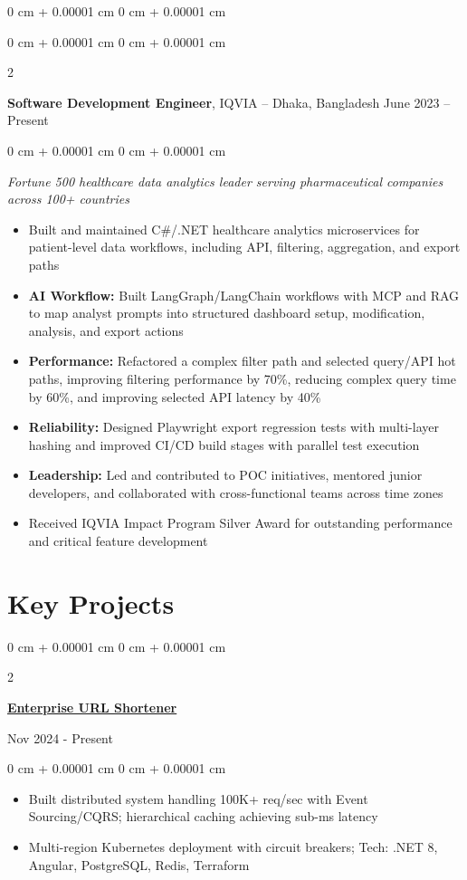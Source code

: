 \documentclass[10pt, letterpaper]{article}
\newenvironment{highlights}{
    \begin{itemize}[
        topsep=0.05 cm,
        parsep=0.05 cm,
        partopsep=0pt,
        itemsep=0pt,
        leftmargin=0 cm + 10pt
    ]
}{
    \end{itemize}
} %
\newenvironment{onecolentry}{
    \begin{adjustwidth}{
        0 cm + 0.00001 cm
    }{
        0 cm + 0.00001 cm
    }
}{
    \end{adjustwidth}
} %
\newenvironment{twocolentry}[2][]{
    \onecolentry
    \def\secondColumn{#2}
    \setcolumnwidth{\fill, 4.5 cm}
    \begin{paracol}{2}
}{
    \switchcolumn \raggedleft \secondColumn
    \end{paracol}
    \endonecolentry
} %
\begin{document}
\begin{onecolentry}
        \begin{twocolentry}{
            June 2023 – Present
        }
            \textbf{Software Development Engineer}, IQVIA -- Dhaka, Bangladesh\end{twocolentry}
        \begin{onecolentry}
            \textit{Fortune 500 healthcare data analytics leader serving pharmaceutical companies across 100+ countries}
            \begin{highlights}
                \item Built and maintained C\#/.NET healthcare analytics microservices for patient-level data workflows, including API, filtering, aggregation, and export paths
                \item \textbf{AI Workflow:} Built LangGraph/LangChain workflows with MCP and RAG to map analyst prompts into structured dashboard setup, modification, analysis, and export actions
                \item \textbf{Performance:} Refactored a complex filter path and selected query/API hot paths, improving filtering performance by 70\%, reducing complex query time by 60\%, and improving selected API latency by 40\%
                \item \textbf{Reliability:} Designed Playwright export regression tests with multi-layer hashing and improved CI/CD build stages with parallel test execution
                \item \textbf{Leadership:} Led and contributed to POC initiatives, mentored junior developers, and collaborated with cross-functional teams across time zones
                \item Received IQVIA Impact Program Silver Award for outstanding performance and critical feature development
            \end{highlights}
        \end{onecolentry}

    \section{Key Projects}

        \begin{twocolentry}{
            Nov 2024 - Present
        }
            \href{https://github.com/thromel/URLShortener}{\textbf{Enterprise URL Shortener}}
        \end{twocolentry}
        \begin{onecolentry}
            \begin{highlights}
                \item Built distributed system handling 100K+ req/sec with Event Sourcing/CQRS; hierarchical caching achieving sub-ms latency
                \item Multi-region Kubernetes deployment with circuit breakers; Tech: .NET 8, Angular, PostgreSQL, Redis, Terraform
            \end{highlights}
        \end{onecolentry}


\end{onecolentry}
\end{document}
